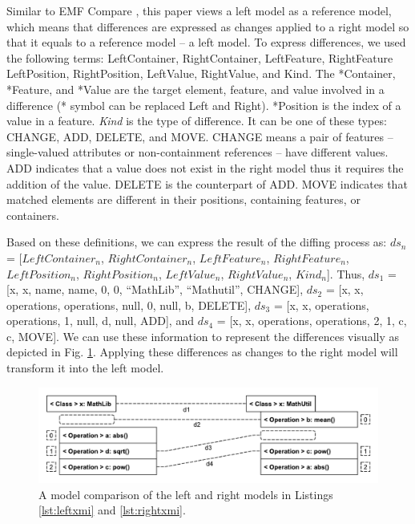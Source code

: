 \documentclass{jot}
\begin{document}
Similar to EMF Compare \cite{emfcompare2018developer}, this paper views a left model as a reference model, which means that differences are expressed as changes applied to a right model so that it equals to a reference model -- a left model. To express differences, we used the following terms: \textsf{LeftContainer}, \textsf{RightContainer}, \textsf{LeftFeature}, \textsf{RightFeature} \textsf{LeftPosition}, \textsf{RightPosition}, \textsf{LeftValue}, \textsf{RightValue}, and \textsf{Kind}. The \textsf{*Container}, \textsf{*Feature}, and \textsf{*Value} are the target element, feature, and value involved in a difference (\textsf{*} symbol can be replaced \textsf{Left} and {Right}). \textsf{*Position} is the index of a value in a feature. \textit{Kind} is the type of difference. It can be one of these types: \textsf{CHANGE}, \textsf{ADD}, \textsf{DELETE}, and \textsf{MOVE}. \textsf{CHANGE} means a pair of features -- single-valued attributes or non-containment references -- have different values. \textsf{ADD} indicates that a value does not exist in the right model thus it requires the addition of the value. \textsf{DELETE} is the counterpart of \textsf{ADD}. \textsf{MOVE} indicates that matched elements are different in their positions, containing features, or containers. 

Based on these definitions, we can express the result of the diffing process as: $ds_{n}$ = [$LeftContainer_n$, $RightContainer_n$, $LeftFeature_n$, $RightFeature_n$, $LeftPosition_n$, $RightPosition_n$, $LeftValue_n$, $RightValue_n$, $Kind_n$]. Thus, $ds_{1}$ =  [\textsf{x}, \textsf{x}, \textsf{name}, \textsf{name}, 0, 0, ``MathLib'', ``Mathutil'', \textsf{CHANGE}], $ds_{2}$ = [\textsf{x}, \textsf{x}, \textsf{operations}, \textsf{operations}, null, 0, null, \textsf{b}, \textsf{DELETE}], $ds_{3}$ = [\textsf{x}, \textsf{x}, \textsf{operations}, \textsf{operations}, 1, null, \textsf{d}, null, \textsf{ADD}], and $ds_{4}$ = [\textsf{x}, \textsf{x}, \textsf{operations}, \textsf{operations}, 2, 1, \textsf{c}, \textsf{c}, \textsf{MOVE}]. We can use these information to represent the differences visually as depicted in Fig. \ref{fig:xmi_comparison}. Applying these differences as changes to the right model will transform it into the left model.  

\begin{figure}
    \includegraphics[width=\linewidth]{XmiComparison}
    \caption{A model comparison of the left and right models in Listings \ref{lst:leftxmi} and \ref{lst:rightxmi}.}
    \label{fig:xmi_comparison}
\end{figure}
\end{document}
